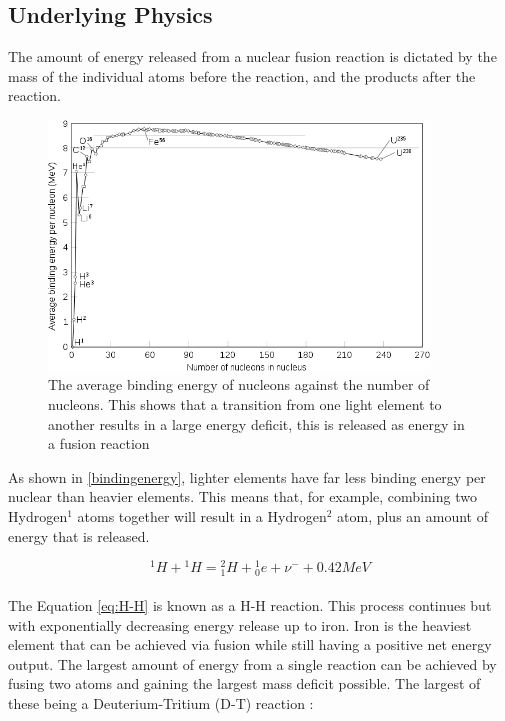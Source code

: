 \documentclass[12pt,a4paper,oneside]{report}
\begin{document}
	\subsection{Underlying Physics}
The amount of energy released from a nuclear fusion reaction is dictated by the mass of the individual atoms before the reaction, and the products after the reaction. \linebreak

\begin{figure}[H]
\includegraphics[width=0.9\textwidth, center]{Images/Bindingenergy.png}
\caption{The average binding energy of nucleons against the number of nucleons. This shows that a transition from one light element to another results in a large energy deficit, this is released as energy in a fusion reaction \cite{Fastfission2008BindingNucleon}}
\label{bindingenergy}
\end{figure}

As shown in \autoref{bindingenergy}, lighter elements have far less binding energy per nuclear than heavier elements. This means that, for example, combining two Hydrogen$^{1}$ atoms together will result in a Hydrogen$^{2}$ atom, plus an amount of energy that is released.

\begin{equation}
{^{1}H} + {^{1}H} = {^{2}_{1}H} + {^{1}_{0}e} + {\nu}^{-} + 0.42MeV
\label{eq:H-H}
\end{equation}
\\
The Equation \ref{eq:H-H} is known as a H-H reaction. This process continues but with exponentially decreasing energy release up to iron. Iron is the heaviest element that can be achieved via fusion while still having a positive net energy output. The largest amount of energy from a single reaction can be achieved by fusing two atoms and gaining the largest mass deficit possible. The largest of these being a Deuterium-Tritium (D-T) reaction \cite[p. 430]{Shultis2016FundamentalsEdition.}:
\end{document}
